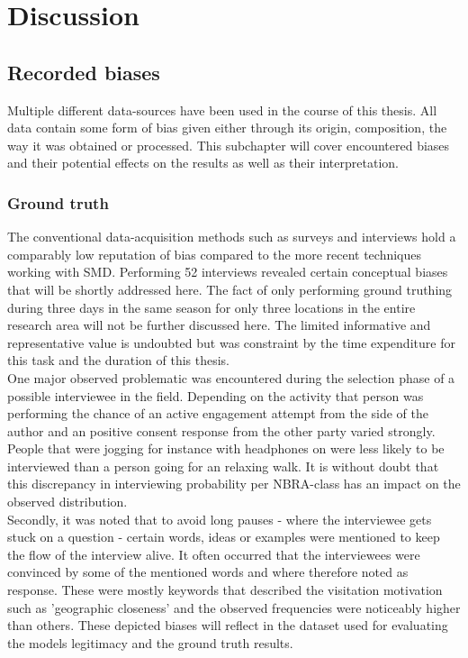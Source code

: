 \chapter{Discussion} \label{discussion}

\section*{Recorded biases}
Multiple different data-sources have been used in the course of this thesis. All data contain some form of bias given either through its origin, composition, the way it was obtained or processed. 
This subchapter will cover encountered biases and their potential effects on the results as well as their interpretation.

\subsection*{Ground truth}
The conventional data-acquisition methods such as surveys and interviews hold a comparably low reputation of bias compared to the more recent techniques working with SMD. Performing 52 interviews revealed certain conceptual biases that will be shortly addressed here. The fact of only performing ground truthing during three days in the same season for only three locations in the entire research area will not be further discussed here. The limited informative and representative value is undoubted but was constraint by the time expenditure for this task and the duration of this thesis. \\
\newline
One major observed problematic was encountered during the selection phase of a possible interviewee in the field. Depending on the activity that person was performing the chance of an active engagement attempt from the side of the author and an positive consent response from the other party varied strongly. People that were jogging for instance with headphones on were less likely to be interviewed than a person going for an relaxing walk. It is without doubt that this discrepancy in interviewing probability per NBRA-class has an impact on the observed distribution.\\
Secondly, it was noted that to avoid long pauses - where the interviewee gets stuck on a question - certain words, ideas or examples were mentioned to keep the flow of the interview alive. It often occurred that the interviewees were convinced by some of the mentioned words and where therefore noted as response. These were mostly keywords that described the visitation motivation such as 'geographic closeness' and the observed frequencies were noticeably higher than others. These depicted biases will reflect in the dataset used for evaluating the models legitimacy and the ground truth results.

